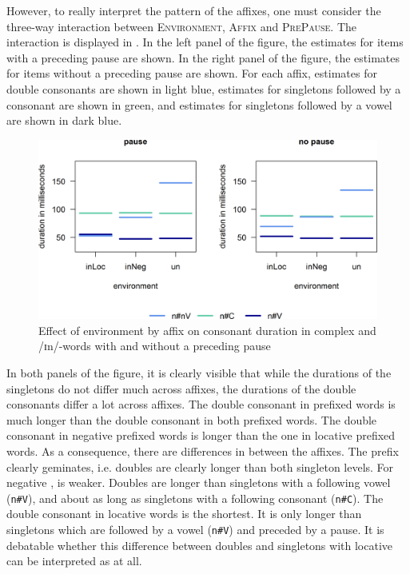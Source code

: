  However, to really interpret the  pattern of the affixes, one must consider the three-way interaction between \textsc{Environment}, \textsc{Affix} and \textsc{PrePause}. The interaction is displayed in . In the left panel of the figure, the estimates for items with a preceding pause are shown. In the right panel of the figure, the estimates for items without a preceding pause are shown. For each affix, estimates for double consonants are shown in light blue, estimates for singletons followed by a consonant are shown in green, and estimates for singletons followed by a vowel are shown in dark blue.






\begin{figure}
	
	\includegraphics [scale=0.6] {images/Experiment/UnInInterEnvAffixPause1}
	
	\caption{Effect of environment by affix on consonant duration in complex  and /ɪn/-words with and without a preceding pause}
	\label{fig:Un In experiment}
\end{figure}


In both panels of the figure, it is clearly visible that while the durations of the singletons do not differ much across affixes, the durations of the double consonants differ a lot across affixes. The double consonant in prefixed words is much longer than the double consonant in both prefixed words.
The double consonant in negative prefixed words is longer than the one in locative prefixed words. 
As a consequence, there are differences in  between the affixes. 
 The prefix  clearly geminates, i.e. doubles are clearly longer than both singleton levels. 
For negative ,  is weaker. Doubles are longer than singletons with a following vowel (\texttt{n\#V}), and about as long as singletons with a following consonant (\texttt{n\#C}). 
The double consonant in locative words is the shortest. It is only longer than singletons which are followed by a vowel (\texttt{n\#V}) and preceded by a pause. It is debatable whether this difference between doubles and singletons with locative  can be interpreted as  at all.

